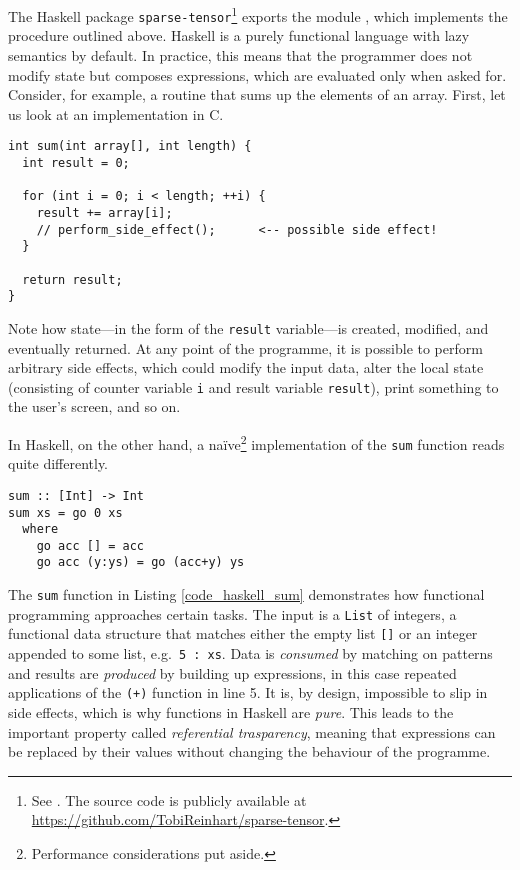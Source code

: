 The Haskell package \texttt{sparse-tensor}\footnote{See \cite{Reinhart_2019_sparse-tensor}. The source code is publicly available at \url{https://github.com/TobiReinhart/sparse-tensor}.} exports the module \texttt{}, which implements the procedure outlined above. Haskell is a purely functional language with lazy semantics by default. \cite{Marlow_2010} In practice, this means that the programmer does not modify state but composes expressions, which are evaluated only when asked for. Consider, for example, a routine that sums up the elements of an array. First, let us look at an implementation in C.
\begin{code}
  \begin{verbatim}
int sum(int array[], int length) {
  int result = 0;

  for (int i = 0; i < length; ++i) {
    result += array[i];
    // perform_side_effect();      <-- possible side effect!
  }

  return result;
}
  \end{verbatim}
\end{code}
Note how state---in the form of the \texttt{result} variable---is created, modified, and eventually returned. At any point of the programme, it is possible to perform arbitrary side effects, which could modify the input data, alter the local state (consisting of counter variable \texttt{i} and result variable \texttt{result}), print something to the user's screen, and so on.

In Haskell, on the other hand, a na\"ive\footnote{Performance considerations put aside.} implementation of the \texttt{sum} function reads quite differently.
\begin{code}
  \begin{verbatim}
sum :: [Int] -> Int
sum xs = go 0 xs
  where
    go acc [] = acc
    go acc (y:ys) = go (acc+y) ys
  \end{verbatim}
  \label{code_haskell_sum}
\end{code}
The \texttt{sum} function in Listing \ref{code_haskell_sum} demonstrates how functional programming approaches certain tasks. The input is a \texttt{List} of integers, a functional data structure that matches either the empty list \texttt{[]} or an integer appended to some list, e.g.\ \texttt{5 : xs}. Data is \emph{consumed} by matching on patterns and results are \emph{produced} by building up expressions, in this case repeated applications of the \texttt{(+)} function in line 5. It is, by design, impossible to slip in side effects, which is why functions in Haskell are \emph{pure}. This leads to the important property called \emph{referential trasparency}, meaning that expressions can be replaced by their values without changing the behaviour of the programme.

